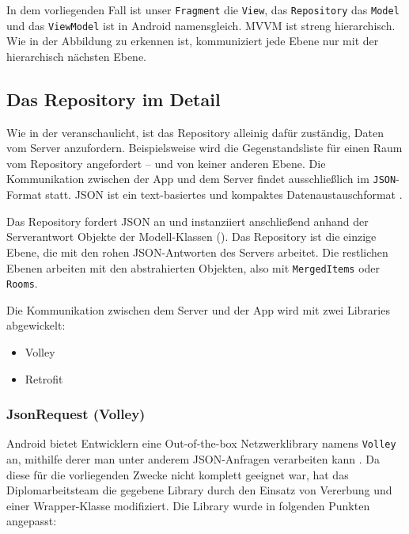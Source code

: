 In dem vorliegenden Fall ist unser \texttt{Fragment} die \texttt{View},
das \texttt{Repository} das \texttt{Model} und das \texttt{ViewModel}
ist in Android namensgleich. MVVM ist streng hierarchisch. Wie in der
Abbildung zu erkennen ist, kommuniziert jede Ebene nur mit der
hierarchisch nächsten Ebene.

\hypertarget{das-repository-im-detail}{%
\subsection{Das Repository im Detail}\label{das-repository-im-detail}}

Wie in der  veranschaulicht, ist das Repository alleinig
dafür zuständig, Daten vom Server anzufordern. Beispielsweise wird die
Gegenstandsliste für einen Raum vom Repository angefordert -- und von
keiner anderen Ebene. Die Kommunikation zwischen der App und dem Server
findet ausschließlich im \texttt{JSON}-Format statt. JSON ist ein
text-basiertes und kompaktes Datenaustauschformat
\cite{json-format-doku}.

Das Repository fordert JSON an und instanziiert anschließend anhand der
Serverantwort Objekte der Modell-Klassen (). Das
Repository ist die einzige Ebene, die mit den rohen JSON-Antworten des
Servers arbeitet. Die restlichen Ebenen arbeiten mit den abstrahierten
Objekten, also \zB mit \texttt{MergedItems} oder \texttt{Rooms}.

Die Kommunikation zwischen dem Server und der App wird mit zwei
Libraries abgewickelt:

\begin{itemize}
\tightlist
\item
  Volley
\item
  Retrofit
\end{itemize}

\hypertarget{jsonrequest-volley}{%
\subsubsection{JsonRequest (Volley)}\label{jsonrequest-volley}}

Android bietet Entwicklern eine Out-of-the-box Netzwerklibrary namens
\texttt{Volley} an, mithilfe derer man unter anderem JSON-Anfragen
verarbeiten kann \cite{volley}. Da diese für die vorliegenden Zwecke
nicht komplett geeignet war, hat das Diplomarbeitsteam die gegebene
Library durch den Einsatz von Vererbung und einer Wrapper-Klasse
modifiziert. Die Library wurde in folgenden Punkten angepasst:

